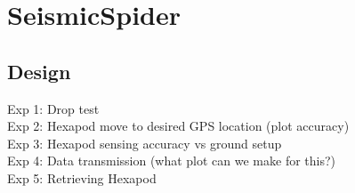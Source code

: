 \section{SeismicSpider}\label{sec:SeismicSpider}

\subsection{Design}
Exp 1: Drop test\\
Exp 2: Hexapod move to desired GPS location (plot accuracy)\\
Exp 3: Hexapod sensing accuracy vs ground setup\\
Exp 4: Data transmission (what plot can we make for this?)\\
Exp 5: Retrieving Hexapod\\
